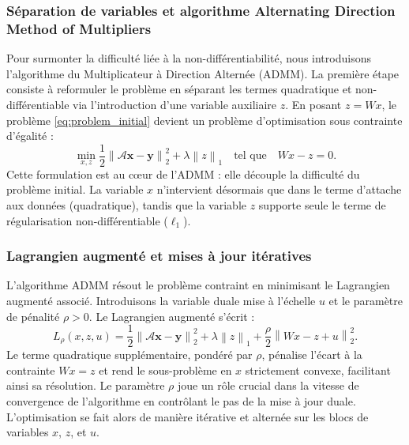 \subsubsection{Séparation de variables et algorithme Alternating Direction Method of Multipliers}
Pour surmonter la difficulté liée à la non-différentiabilité, nous introduisons l'algorithme du Multiplicateur à Direction Alternée (ADMM). La première étape consiste à reformuler le problème en séparant les termes quadratique et non-différentiable via l'introduction d'une variable auxiliaire \(z\). En posant \(z = Wx\), le problème \eqref{eq:problem_initial} devient un problème d'optimisation sous contrainte d'égalité :
\begin{equation}
\min_{x,z} \frac{1}{2}\left\| \mathcal{A}\mathbf{x} - \mathbf{y} \right\|_{2}^{2} + \lambda \left\|z\right\|_{1} \quad \text{tel que} \quad Wx - z = 0.
\end{equation}
Cette formulation est au cœur de l'ADMM : elle découple la difficulté du problème initial. La variable \(x\) n'intervient désormais que dans le terme d'attache aux données (quadratique), tandis que la variable \(z\) supporte seule le terme de régularisation non-différentiable (\(\ell_1\)).

\subsubsection{Lagrangien augmenté et mises à jour itératives}
L'algorithme ADMM résout le problème contraint en minimisant le Lagrangien augmenté associé. Introduisons la variable duale mise à l'échelle \(u\) et le paramètre de pénalité \(\rho > 0\). Le Lagrangien augmenté s'écrit :
\begin{equation}
L_\rho(x, z, u) = \frac{1}{2}\left\| \mathcal{A}\mathbf{x} - \mathbf{y} \right\|_{2}^{2} + \lambda \left\|z\right\|_{1} + \frac{\rho}{2}\left\| Wx - z + u \right\|_{2}^{2}.
\end{equation}
Le terme quadratique supplémentaire, pondéré par \(\rho\), pénalise l'écart à la contrainte \(Wx = z\) et rend le sous-problème en \(x\) strictement convexe, facilitant ainsi sa résolution. Le paramètre \(\rho\) joue un rôle crucial dans la vitesse de convergence de l'algorithme en contrôlant le pas de la mise à jour duale. L'optimisation se fait alors de manière itérative et alternée sur les blocs de variables \(x\), \(z\), et \(u\).

